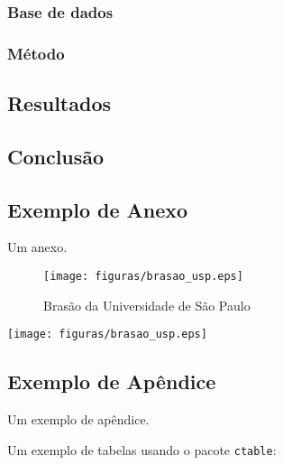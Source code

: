 \documentclass[ppgcc]{fearp}
\begin{document}
\subsection{Base de dados}
\subsection{Método}
\section{Resultados}
\section{Conclusão}





\begin{anexosenv}
\chapter{Exemplo de Anexo}
Um anexo.
\begin{figure}[H]
 \caption{Brasão da Universidade de São Paulo}
    \centering
    \texttt{[image: figuras/brasao\_usp.eps]}
    \label{fig:brasao2}
\end{figure}

{\texttt{[image: figuras/brasao\_usp.eps]}}

\end{anexosenv}

\begin{apendicesenv}
\chapter{Exemplo de Apêndice}
Um exemplo de apêndice.

Um exemplo de tabelas usando o pacote \texttt{ctable}:

\end{apendicesenv}
\end{document}
